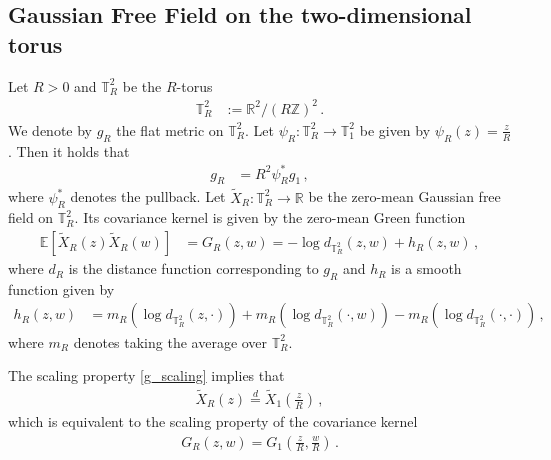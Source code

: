 \documentclass[11pt]{article}
\numberwithin{equation}{section}
\theoremstyle{definition}
\renewcommand{\tilde}{\widetilde}          %
\newcommand{\R}{\mathbb{R}}
\newcommand{\Z}{\mathbb{Z}}
\newcommand{\E}{\mathbb{E}}
\def\T{\mathbb{T}}
\newcommand{\grea}{>}
\newcommand{\tor}{{\T_1^2}}
\newcommand{\toR}{{\T_R^2}}
\begin{document}
\subsection{Gaussian Free Field on the two-dimensional torus}\label{s_gff}

Let $R \grea 0$ and $\toR$ be the $R$-torus
\begin{align*}
\toR &:= \R^2 / (R \Z)^2\,.
\end{align*}
We denote by $g_R$ the flat metric on $\toR$. Let $\psi_R: \toR \to \tor$ be given by $\psi_R(z) = \frac{z}{R}$. Then it holds that
\begin{align}\label{g_scaling}
g_R &= R^2 \psi_R^* g_1\,,
\end{align}
where $\psi_R^*$ denotes the pullback. Let $\tilde X_R: \toR \to \R$ be the zero-mean Gaussian free field on $\toR$. Its covariance kernel is given by the zero-mean Green function 
\begin{align}\label{green}
\E[\tilde X_R(z) \tilde X_R(w)] &= G_R(z,w) = -\log d_{\toR}(z,w) + h_R(z,w)\,,
\end{align}
where $d_R$ is the distance function corresponding to $g_R$ and $h_R$ is a smooth function given by
\begin{align*}
h_R(z,w) &=  m_R( \log d_\toR(z,\cdot)) + m_R(\log d_\toR(\cdot,w)) - m_R(\log d_\toR(\cdot, \cdot) )\,,
\end{align*}
where $m_R$ denotes taking the average over $\toR$.

The scaling property \eqref{g_scaling} implies that
\begin{align}\label{gff_scaling}
\tilde X_R(z) \overset{d}{=} \tilde X_1(\tfrac{z}{R})\,,
\end{align}
which is equivalent to the scaling property of the covariance kernel
\begin{align*}
G_R(z,w) = G_1(\tfrac zR, \tfrac wR)\,.
\end{align*}
\end{document}
